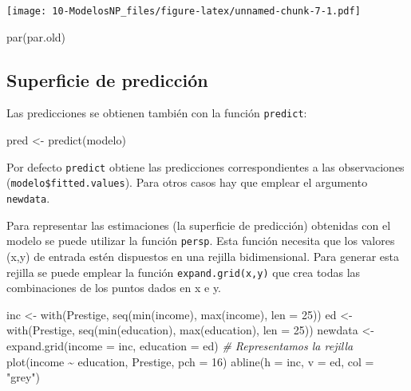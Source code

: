 \documentclass[
]{book}
\newenvironment{Shaded}{\begin{snugshade}}{\end{snugshade}}
\newcommand{\AttributeTok}[1]{\textcolor[rgb]{0.77,0.63,0.00}{#1}}
\newcommand{\CommentTok}[1]{\textcolor[rgb]{0.56,0.35,0.01}{\textit{#1}}}
\newcommand{\DecValTok}[1]{\textcolor[rgb]{0.00,0.00,0.81}{#1}}
\newcommand{\FunctionTok}[1]{\textcolor[rgb]{0.00,0.00,0.00}{#1}}
\newcommand{\NormalTok}[1]{#1}
\newcommand{\OtherTok}[1]{\textcolor[rgb]{0.56,0.35,0.01}{#1}}
\newcommand{\SpecialCharTok}[1]{\textcolor[rgb]{0.00,0.00,0.00}{#1}}
\newcommand{\StringTok}[1]{\textcolor[rgb]{0.31,0.60,0.02}{#1}}
\theoremstyle{break}
\begin{document}
\texttt{[image: 10-ModelosNP\_files/figure-latex/unnamed-chunk-7-1.pdf]}

\begin{Shaded}
\begin{Highlighting}[]
\FunctionTok{par}\NormalTok{(par.old)}
\end{Highlighting}
\end{Shaded}

\hypertarget{superficie-de-predicciuxf3n}{%
\subsection{Superficie de predicción}\label{superficie-de-predicciuxf3n}}

Las predicciones se obtienen también con la función \texttt{predict}:

\begin{Shaded}
\begin{Highlighting}[]
\NormalTok{pred }\OtherTok{\textless{}{-}} \FunctionTok{predict}\NormalTok{(modelo)}
\end{Highlighting}
\end{Shaded}

Por defecto \texttt{predict} obtiene las predicciones correspondientes a las observaciones (\texttt{modelo\$fitted.values}). Para otros casos hay que emplear el argumento \texttt{newdata}.

Para representar las estimaciones (la superficie de predicción) obtenidas con el modelo se puede
utilizar la función \texttt{persp}. Esta función necesita que los valores (x,y) de entrada estén
dispuestos en una rejilla bidimensional. Para generar esta rejilla se puede emplear la función \texttt{expand.grid(x,y)} que crea todas las combinaciones de los puntos dados en x e y.

\begin{Shaded}
\begin{Highlighting}[]
\NormalTok{inc }\OtherTok{\textless{}{-}} \FunctionTok{with}\NormalTok{(Prestige, }\FunctionTok{seq}\NormalTok{(}\FunctionTok{min}\NormalTok{(income), }\FunctionTok{max}\NormalTok{(income), }\AttributeTok{len =} \DecValTok{25}\NormalTok{))}
\NormalTok{ed }\OtherTok{\textless{}{-}} \FunctionTok{with}\NormalTok{(Prestige, }\FunctionTok{seq}\NormalTok{(}\FunctionTok{min}\NormalTok{(education), }\FunctionTok{max}\NormalTok{(education), }\AttributeTok{len =} \DecValTok{25}\NormalTok{))}
\NormalTok{newdata }\OtherTok{\textless{}{-}} \FunctionTok{expand.grid}\NormalTok{(}\AttributeTok{income =}\NormalTok{ inc, }\AttributeTok{education =}\NormalTok{ ed)}
\CommentTok{\# Representamos la rejilla}
\FunctionTok{plot}\NormalTok{(income }\SpecialCharTok{\textasciitilde{}}\NormalTok{ education, Prestige, }\AttributeTok{pch =} \DecValTok{16}\NormalTok{)}
\FunctionTok{abline}\NormalTok{(}\AttributeTok{h =}\NormalTok{ inc, }\AttributeTok{v =}\NormalTok{ ed, }\AttributeTok{col =} \StringTok{"grey"}\NormalTok{)}
\end{Highlighting}
\end{Shaded}
\end{document}

